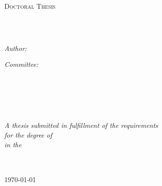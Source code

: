 \documentclass[
11pt, %
english, %
doublespacing, %
headsepline, %
]{MastersDoctoralThesis} %
\author{Zhengxing Chen} %
\begin{document}
\frontmatter %

\pagestyle{plain} %


\begin{titlepage}
\begin{center}

{\scshape\LARGE \univname\par}\vspace{0.5cm} %
\textsc{\Large Doctoral Thesis}\\[0.5cm] %

\HRule \\[0.4cm] %
{\huge \bfseries \ttitle\par}\vspace{0.4cm} %
\HRule \\[1.5cm] %
 
\begin{minipage}[t]{0.4\textwidth}
\begin{flushleft} \large
\emph{Author:}\\
{\authorname} %
\end{flushleft}
\end{minipage}
\begin{minipage}[t]{0.4\textwidth}
\begin{flushright} \large
\emph{Committee:} \\
{\supname} \\ %
{\supnameone} \\
{\supnametwo} \\ 
{\supnamethree} 
\end{flushright}
\end{minipage}\\[3cm]
 
\vfill

\large \textit{A thesis submitted in fulfillment of the requirements\\ for the degree of \degreename}\\[0.3cm] %
\textit{in the}\\[0.4cm]
\deptname\\\univname\\[2cm] %
 
\vfill

{\large \today}\\[4cm] %
 
\vfill
\end{center}
\end{titlepage}
\end{document}
